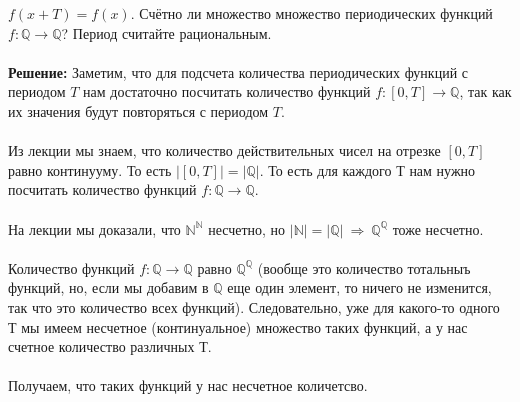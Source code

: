 \documentclass[a4paper, 12pt]{article}
\begin{document}
    $f(x+T) = f(x)$. Счётно ли множество множество периодических функций $f: \mathbb{Q} \to \mathbb{Q}$? Период считайте
    рациональным.
    \\
    \\ \textbf{Решение: } Заметим, что для подсчета количества периодических функций с периодом $T$ нам достаточно посчитать количество функций $f : [0, T] \to \mathbb{Q}$, так как их значения будут повторяться с периодом $T$.
    \\
    \\ Из лекции мы знаем, что количество действительных чисел на отрезке $[0, T]$ равно континууму. То есть $|[0, T]| = |\mathbb{Q}|$. То есть для каждого Т нам нужно посчитать количество функций $f: \mathbb{Q} \to \mathbb{Q}$.
    \\
    \\ На лекции мы доказали, что $\mathbb{N}^{\mathbb{N}}$ несчетно, но $|\mathbb{N}| = |\mathbb{Q}| \ \Rightarrow \ \mathbb{Q}^{\mathbb{Q}}$ тоже несчетно.
    \\
    \\ Количество функций $f: \mathbb{Q} \to \mathbb{Q}$ равно $\mathbb{Q}^{\mathbb{Q}}$ (вообще это количество тотальныъ функций, но, если мы добавим в $\mathbb{Q}$ еще один элемент, то ничего не изменится, так что это количество всех функций). Следовательно, уже для какого-то одного Т мы имеем несчетное (континуальное) множество таких функций, а у нас счетное количество различных Т.
    \\
    \\ Получаем, что таких функций у нас несчетное количетсво.
    
\end{document}
